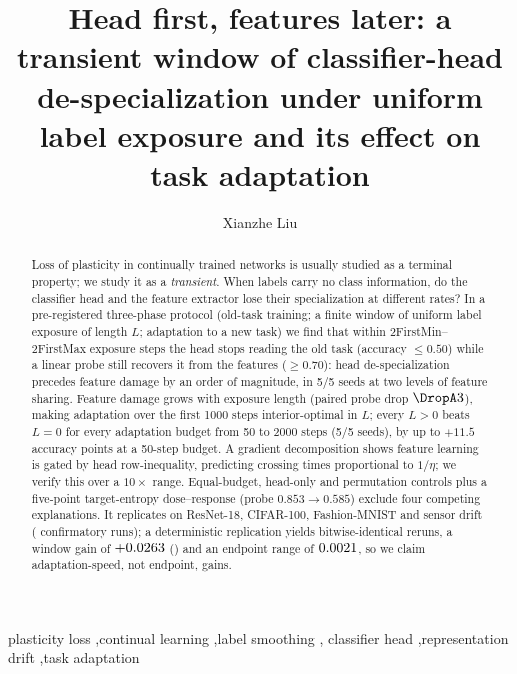 \documentclass[review,12pt]{elsarticle}
\begin{document}
\begin{frontmatter}

\title{Head first, features later: a transient window of classifier-head
de-specialization under uniform label exposure and its effect on task adaptation}

\author[a]{Xianzhe Liu}

\begin{abstract}
Loss of plasticity in continually trained networks is usually studied as a
terminal property; we study it as a \emph{transient}. When labels carry no
class information, do the classifier head and the feature extractor lose their
specialization at different rates?
In a pre-registered three-phase protocol (old-task training; a finite window of
uniform label exposure of length $L$; adaptation to a new task) we find that
within \A2FirstMin--\A2FirstMax{} exposure steps the head
stops reading the old task (accuracy $\le0.50$) while a linear probe still
recovers it from the features ($\ge0.70$): head de-specialization precedes
feature damage by an order of magnitude, in 5/5 seeds at two levels of
feature sharing. Feature damage grows with exposure length (paired probe drop
$\DropA3$), making adaptation over the first 1000 steps interior-optimal in
$L$; every $L>0$ beats $L{=}0$ for every adaptation budget from 50 to 2000
steps (5/5 seeds), by up to $+11.5$ accuracy points at a 50-step budget. A
gradient decomposition shows feature learning is gated by head row-inequality,
predicting crossing times proportional to $1/\eta$; we verify this over a
$10\times$ range. Equal-budget, head-only and permutation controls plus a
five-point target-entropy dose--response (probe $0.853\to0.585$) exclude four
competing explanations. It replicates on ResNet-18, CIFAR-100, Fashion-MNIST
and sensor drift (\NumConfirmatory{} confirmatory runs); a deterministic
replication yields
bitwise-identical reruns, a window gain of $+0.0263$ (\DetWindowPos)
and an endpoint range of $0.0021$, so we claim adaptation-speed, not
endpoint, gains.
\end{abstract}

\begin{keyword}
plasticity loss \sep continual learning \sep label smoothing \sep
classifier head \sep representation drift \sep task adaptation
\end{keyword}


\end{frontmatter}
\end{document}
